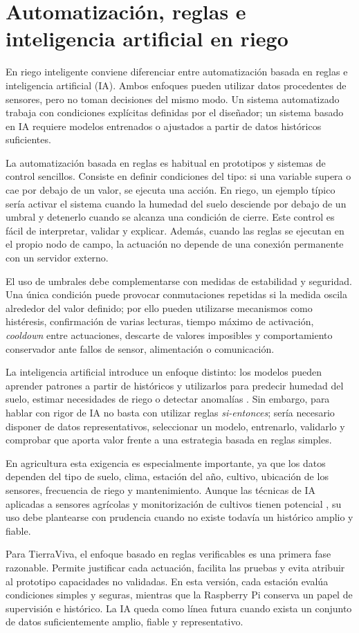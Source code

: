 \section{Automatización, reglas e inteligencia artificial en riego}
\label{sec:automatizacion_reglas_ia_riego}

En riego inteligente conviene diferenciar entre automatización basada en reglas e inteligencia artificial (IA). Ambos enfoques pueden utilizar datos procedentes de sensores, pero no toman decisiones del mismo modo. Un sistema automatizado trabaja con condiciones explícitas definidas por el diseñador; un sistema basado en IA requiere modelos entrenados o ajustados a partir de datos históricos suficientes.

La automatización basada en reglas es habitual en prototipos y sistemas de control sencillos. Consiste en definir condiciones del tipo: si una variable supera o cae por debajo de un valor, se ejecuta una acción. En riego, un ejemplo típico sería activar el sistema cuando la humedad del suelo desciende por debajo de un umbral y detenerlo cuando se alcanza una condición de cierre. Este control es fácil de interpretar, validar y explicar. Además, cuando las reglas se ejecutan en el propio nodo de campo, la actuación no depende de una conexión permanente con un servidor externo.

El uso de umbrales debe complementarse con medidas de estabilidad y seguridad. Una única condición puede provocar conmutaciones repetidas si la medida oscila alrededor del valor definido; por ello pueden utilizarse mecanismos como histéresis, confirmación de varias lecturas, tiempo máximo de activación, \textit{cooldown} entre actuaciones, descarte de valores imposibles y comportamiento conservador ante fallos de sensor, alimentación o comunicación.

La inteligencia artificial introduce un enfoque distinto: los modelos pueden aprender patrones a partir de históricos y utilizarlos para predecir humedad del suelo, estimar necesidades de riego o detectar anomalías \cite{abioye2020,bwambale2022}. Sin embargo, para hablar con rigor de IA no basta con utilizar reglas \textit{si-entonces}; sería necesario disponer de datos representativos, seleccionar un modelo, entrenarlo, validarlo y comprobar que aporta valor frente a una estrategia basada en reglas simples.

En agricultura esta exigencia es especialmente importante, ya que los datos dependen del tipo de suelo, clima, estación del año, cultivo, ubicación de los sensores, frecuencia de riego y mantenimiento. Aunque las técnicas de IA aplicadas a sensores agrícolas y monitorización de cultivos tienen potencial \cite{taha2025,naqvi2025}, su uso debe plantearse con prudencia cuando no existe todavía un histórico amplio y fiable.

Para TierraViva, el enfoque basado en reglas verificables es una primera fase razonable. Permite justificar cada actuación, facilita las pruebas y evita atribuir al prototipo capacidades no validadas. En esta versión, cada estación evalúa condiciones simples y seguras, mientras que la Raspberry Pi conserva un papel de supervisión e histórico. La IA queda como línea futura cuando exista un conjunto de datos suficientemente amplio, fiable y representativo.